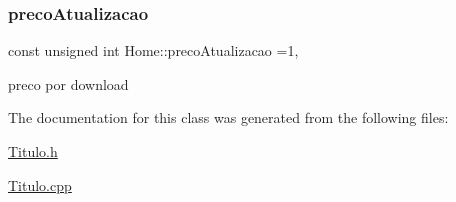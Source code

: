 \subsubsection{\texorpdfstring{preco\+Atualizacao}{precoAtualizacao}}
{\footnotesize\ttfamily const unsigned int Home\+::preco\+Atualizacao =1\hspace{0.3cm}{\ttfamily [static]}, {\ttfamily [private]}}

preco por download 

The documentation for this class was generated from the following files\+:\begin{DoxyCompactItemize}
\item 
\mbox{\hyperlink{_titulo_8h}{Titulo.\+h}}\item 
\mbox{\hyperlink{_titulo_8cpp}{Titulo.\+cpp}}\end{DoxyCompactItemize}
